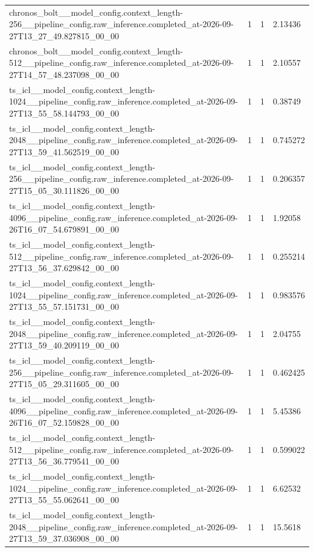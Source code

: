 \begin{tabular}{llll}
chronos\_bolt\_\_model\_config.context\_length-256\_\_pipeline\_config.raw\_inference.completed\_at-2026-09-27T13\_27\_49.827815\_00\_00 & 1 & 1 & 2.13436 \\
chronos\_bolt\_\_model\_config.context\_length-512\_\_pipeline\_config.raw\_inference.completed\_at-2026-09-27T14\_57\_48.237098\_00\_00 & 1 & 1 & 2.10557 \\
ts\_icl\_\_model\_config.context\_length-1024\_\_pipeline\_config.raw\_inference.completed\_at-2026-09-27T13\_55\_58.144793\_00\_00 & 1 & 1 & 0.38749 \\
ts\_icl\_\_model\_config.context\_length-2048\_\_pipeline\_config.raw\_inference.completed\_at-2026-09-27T13\_59\_41.562519\_00\_00 & 1 & 1 & 0.745272 \\
ts\_icl\_\_model\_config.context\_length-256\_\_pipeline\_config.raw\_inference.completed\_at-2026-09-27T15\_05\_30.111826\_00\_00 & 1 & 1 & 0.206357 \\
ts\_icl\_\_model\_config.context\_length-4096\_\_pipeline\_config.raw\_inference.completed\_at-2026-09-26T16\_07\_54.679891\_00\_00 & 1 & 1 & 1.92058 \\
ts\_icl\_\_model\_config.context\_length-512\_\_pipeline\_config.raw\_inference.completed\_at-2026-09-27T13\_56\_37.629842\_00\_00 & 1 & 1 & 0.255214 \\
ts\_icl\_\_model\_config.context\_length-1024\_\_pipeline\_config.raw\_inference.completed\_at-2026-09-27T13\_55\_57.151731\_00\_00 & 1 & 1 & 0.983576 \\
ts\_icl\_\_model\_config.context\_length-2048\_\_pipeline\_config.raw\_inference.completed\_at-2026-09-27T13\_59\_40.209119\_00\_00 & 1 & 1 & 2.04755 \\
ts\_icl\_\_model\_config.context\_length-256\_\_pipeline\_config.raw\_inference.completed\_at-2026-09-27T15\_05\_29.311605\_00\_00 & 1 & 1 & 0.462425 \\
ts\_icl\_\_model\_config.context\_length-4096\_\_pipeline\_config.raw\_inference.completed\_at-2026-09-26T16\_07\_52.159828\_00\_00 & 1 & 1 & 5.45386 \\
ts\_icl\_\_model\_config.context\_length-512\_\_pipeline\_config.raw\_inference.completed\_at-2026-09-27T13\_56\_36.779541\_00\_00 & 1 & 1 & 0.599022 \\
ts\_icl\_\_model\_config.context\_length-1024\_\_pipeline\_config.raw\_inference.completed\_at-2026-09-27T13\_55\_55.062641\_00\_00 & 1 & 1 & 6.62532 \\
ts\_icl\_\_model\_config.context\_length-2048\_\_pipeline\_config.raw\_inference.completed\_at-2026-09-27T13\_59\_37.036908\_00\_00 & 1 & 1 & 15.5618 \\

\end{tabular}

